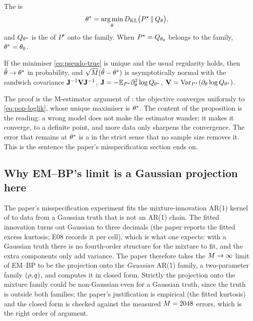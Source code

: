 \begin{definition}
\label{def:pseudo-true}
The  is
\begin{equation}
  \theta^\ast=\operatorname*{arg\,min}_\theta D_{\mathrm{KL}}\bigl(P^\star\,\|\,Q_\theta\bigr),
  \label{eq:pseudo-true}
\end{equation}
and $Q_{\theta^\ast}$ is the  of $P^\star$ onto the
family. When $P^\star=Q_{\theta_0}$ belongs to the family, $\theta^\ast=\theta_0$.
\end{definition}

\begin{proposition}[White]
\label{prop:white}
If the minimiser \cref{eq:pseudo-true} is unique and the usual regularity holds, then
$\hat{\theta}\to\theta^\ast$ in probability, and
$\sqrt{M}(\hat{\theta}-\theta^\ast)$ is asymptotically normal with the sandwich
covariance $\mathbf{J}^{-1}\mathbf{V}\mathbf{J}^{-1}$, $\mathbf{J}=-\mathbb{E}_{P^\star}\partial^2_\theta\log Q_{\theta^\ast}$,
$\mathbf{V}=\operatorname{Var}_{P^\star}(\partial_\theta\log Q_{\theta^\ast})$.
\end{proposition}

The proof is the M-estimator argument of : the
objective converges uniformly to \cref{eq:pop-loglik}, whose unique maximiser is
$\theta^\ast$. The content of the proposition is the reading: a wrong model does not
make the estimator wander; it makes it converge, to a definite point, and more data
only sharpens the convergence. The error that remains at $\theta^\ast$ is a
 in the strict sense that no sample size removes it. This is the sentence
the paper's misspecification section ends on.

\subsection{Why EM--BP's limit is a Gaussian projection here}

The paper's misspecification experiment fits the mixture-innovation AR(1) kernel of
 to data from a Gaussian truth that is not an AR(1) chain. The
fitted innovation turns out Gaussian to three decimals (the paper reports the fitted
excess kurtosis; E08 records it per cell), which is what one expects: with a Gaussian
truth there is no fourth-order structure for the mixture to fit, and the extra
components only add variance. The paper therefore takes the $M\to\infty$ limit of
EM--BP to be the projection onto the \emph{Gaussian} AR(1) family, a two-parameter family
$(\rho,q)$, and computes it in closed form. Strictly the projection onto the
mixture family could be non-Gaussian even for a Gaussian truth, since the truth is
outside both families; the paper's justification is empirical (the fitted kurtosis)
and the closed form is checked against the measured $M=2048$ errors, which is the
right order of argument.

